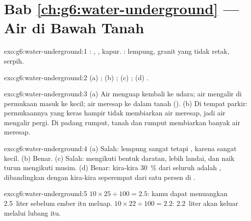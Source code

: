 \section*{Bab \ref{ch:g6:water-underground} --- Air di Bawah Tanah}

\begin{solution}{exo:g6:water-underground:1}
: , , kapur. : lempung, granit yang tidak
retak, serpih.
\end{solution}

\begin{solution}{exo:g6:water-underground:2}
(a) ; (b) ; (c) ; (d) .
\end{solution}

\begin{solution}{exo:g6:water-underground:3}
(a) Air menguap kembali ke udara; air mengalir di permukaan masuk ke
 kecil; air meresap ke dalam tanah (). (b) Di tempat
parkir: permukaannya yang keras hampir tidak membiarkan air meresap, jadi
air mengalir pergi. Di padang rumput, tanah dan rumput membiarkan banyak air
meresap.
\end{solution}

\begin{solution}{exo:g6:water-underground:4}
(a) Salah: lempung sangat  tetapi , karena  sangat
kecil. (b) Benar. (c) Salah:  mengikuti bentuk daratan, lebih
landai, dan naik turun mengikuti musim. (d) Benar: kira-kira 30~\% dari
seluruh  adalah , dibandingkan dengan kira-kira seperempat
dari satu persen di .
\end{solution}

\begin{solution}{exo:g6:water-underground:5}
$10 \times 25 \div 100 = 2.5$: kamu dapat menuangkan 2.5~liter sebelum ember
itu meluap. $10 \times 22 \div 100 = 2.2$: 2.2~liter akan keluar melalui
lubang itu.
\end{solution}

